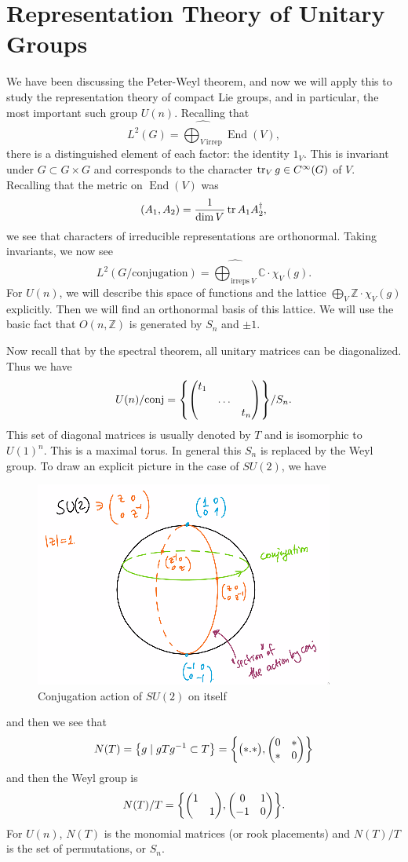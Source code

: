 \documentclass[leqno, openany]{memoir}
\theoremstyle{definition}
\theoremstyle{remark}
\theoremstyle{plain}
\theoremstyle{definition}
\theoremstyle{remark}
\newcommand{\C}{\mathbb{C}}
\newcommand{\Z}{\mathbb{Z}}
\newcommand{\wh}[1]{\widehat{#1}}
\DeclareMathOperator{\End}{End}
\begin{document}
\section{Representation Theory of Unitary Groups}%
\label{sec:representation_theory_of_unitary_groups}

We have been discussing the Peter-Weyl theorem, and now we will apply this to study the representation theory of compact Lie groups, and in particular, the most important such group $U(n)$. Recalling that 
\[ L^2(G) = \wh{\bigoplus_{V\ \text{irrep}}} \End(V), \]
there is a distinguished element of each factor: the identity $1_V$. This is invariant under $G \subset G \times G$ and corresponds to the character $\tr_V g \in C^{\infty}(G)$ of $V$. Recalling that the metric on $\End(V)$ was
\[ (A_1, A_2) = \frac{1}{\dim V} \tr A_1 A_2^{\dag}, \]
we see that characters of irreducible representations are orthonormal. Taking invariants, we now see
\[ L^2(G/\text{conjugation}) = \wh{\bigoplus_{\text{irreps}\ V}} \C \cdot \chi_V(g). \]
For $U(n)$, we will describe this space of functions and the lattice $\bigoplus_V \Z \cdot \chi_V(g)$ explicitly. Then we will find an orthonormal basis of this lattice. We will use the basic fact that $O(n, \Z)$ is generated by $S_n$ and $\pm 1$.

Now recall that by the spectral theorem, all unitary matrices can be diagonalized. Thus we have
\[ U(n) / \text{conj} = \qty{ \mqty(\dmat{t_1, \ldots, t_n}) } / S_n. \]
This set of diagonal matrices is usually denoted by $T$ and is isomorphic to $U(1)^n$. This is a maximal torus. In general this $S_n$ is replaced by the Weyl group. To draw an explicit picture in the case of $SU(2)$, we have
\begin{figure}[H]
    \centering
    \includegraphics[scale=0.8]{su2conj.png}
    \caption{Conjugation action of $SU(2)$ on itself}%
    \label{fig:su2conj}
\end{figure}
and then we see that
\[ N(T) = \qty{g \mid gTg^{-1} \subset T} = \qty{ \mqty( \dmat{*.*} ), \mqty( 0 & * \\ * & 0 ) } \]
and then the Weyl group is 
\[ N(T) / T = \qty{ \mqty( \dmat{1,1} ), \mqty(0 & 1 \\ -1 & 0) }. \]
For $U(n)$, $N(T)$ is the monomial matrices (or rook placements) and $N(T)/T$ is the set of permutations, or $S_n$.
\end{document}
